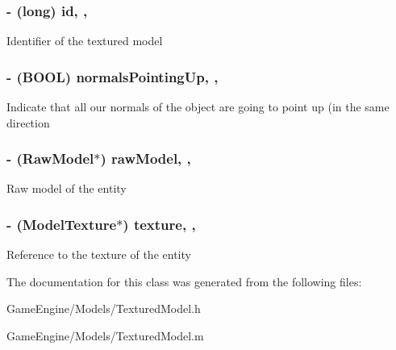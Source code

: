 \subsubsection[{\texorpdfstring{id}{id}}]{\setlength{\rightskip}{0pt plus 5cm}-\/ (long) id\hspace{0.3cm}{\ttfamily [read]}, {\ttfamily [atomic]}, {\ttfamily [assign]}}\hypertarget{interface_textured_model_aca9eab5290f81898de99b46078419ebc}{}\label{interface_textured_model_aca9eab5290f81898de99b46078419ebc}
Identifier of the textured model 
\subsubsection[{\texorpdfstring{normals\+Pointing\+Up}{normalsPointingUp}}]{\setlength{\rightskip}{0pt plus 5cm}-\/ (B\+O\+OL) normals\+Pointing\+Up\hspace{0.3cm}{\ttfamily [read]}, {\ttfamily [write]}, {\ttfamily [atomic]}}\hypertarget{interface_textured_model_a04689af3a31961d1f4fcf058e264c3c8}{}\label{interface_textured_model_a04689af3a31961d1f4fcf058e264c3c8}
Indicate that all our normals of the object are going to point up (in the same direction 
\subsubsection[{\texorpdfstring{raw\+Model}{rawModel}}]{\setlength{\rightskip}{0pt plus 5cm}-\/ ({\bf Raw\+Model}$\ast$) raw\+Model\hspace{0.3cm}{\ttfamily [read]}, {\ttfamily [atomic]}, {\ttfamily [assign]}}\hypertarget{interface_textured_model_a502115a1985353177ee79ee41bf5f88f}{}\label{interface_textured_model_a502115a1985353177ee79ee41bf5f88f}
Raw model of the entity 
\subsubsection[{\texorpdfstring{texture}{texture}}]{\setlength{\rightskip}{0pt plus 5cm}-\/ ({\bf Model\+Texture}$\ast$) texture\hspace{0.3cm}{\ttfamily [read]}, {\ttfamily [atomic]}, {\ttfamily [assign]}}\hypertarget{interface_textured_model_a4044c19645d8a4dbb6bb1e7c0fe8d5e9}{}\label{interface_textured_model_a4044c19645d8a4dbb6bb1e7c0fe8d5e9}
Reference to the texture of the entity 

The documentation for this class was generated from the following files\+:\begin{DoxyCompactItemize}
\item 
Game\+Engine/\+Models/Textured\+Model.\+h\item 
Game\+Engine/\+Models/Textured\+Model.\+m\end{DoxyCompactItemize}
